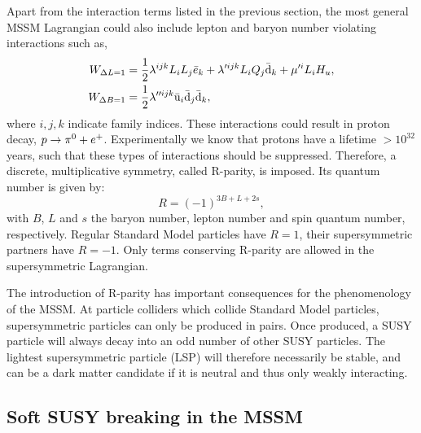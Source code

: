Apart from the interaction terms listed in the previous section, the most general MSSM Lagrangian
could also include lepton and baryon number violating interactions such as, 
\begin{align}
  W_{\Delta L=1} &= \frac{1}{2} \lambda^{ijk} L_i L_j \bar{e}_k + \lambda'^{ijk} L_i Q_j
\bar{\mathrm{d}}_k + \mu'^{i} L_i H_u, \\
  W_{\Delta B=1} &= \frac{1}{2} \lambda''^{ijk} \bar{\mathrm{u}}_i \bar{\mathrm{d}}_j \bar{\mathrm{d}}_k, \\
\end{align}
where $i,j,k$ indicate family indices. 
These interactions could result in proton decay, ${p} \rightarrow \pi^0 + e^+$. Experimentally we
know that protons have a lifetime $>\text{10}^{\text{32}}$ years, such that these types of
interactions should be suppressed. 
Therefore, a discrete, multiplicative symmetry, called R-parity, is imposed. Its quantum number
is given by: 
\begin{equation}
  R = (-1)^{3B+L+2s} ,
\end{equation}
with $B$, $L$ and $s$ the baryon number, lepton number and spin quantum number, respectively. 
Regular Standard Model particles have $R=1$, their supersymmetric partners have $R=-1$. Only
terms conserving R-parity are allowed in the supersymmetric Lagrangian. 

The introduction of R-parity has important consequences for the phenome\-nology of the MSSM.
At particle colliders which collide Standard Model particles, supersymmetric particles can only be
produced in pairs. Once produced, a SUSY particle will always decay into an odd number of other SUSY
particles. The lightest supersymmetric particle (LSP) will therefore necessarily be stable, and can
be a dark matter candidate if it is neutral and thus only weakly interacting. 


\subsection{Soft SUSY breaking in the MSSM}

